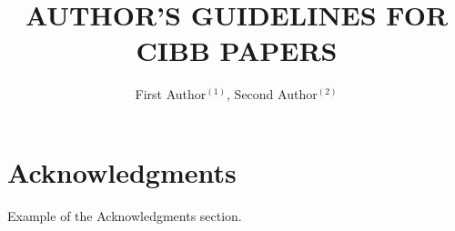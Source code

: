 \documentclass[12pt,a4paper]{cibb}
\title{\large $\ $\\ \bf AUTHOR'S GUIDELINES FOR CIBB PAPERS}
\author{ First Author$^{(1)}$, Second Author$^{(2)}$}
\begin{document}
\thispagestyle{myheadings}
\pagestyle{myheadings}







\section*{\bf Acknowledgments}

Example of the Acknowledgments section.







\end{document}
